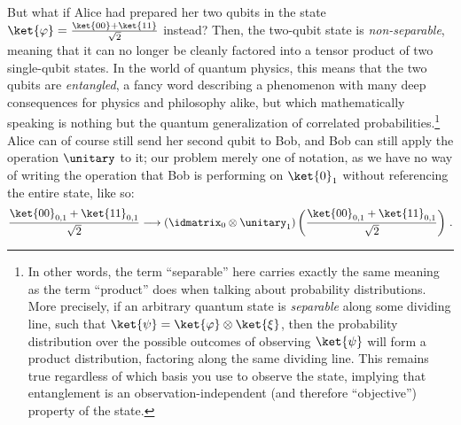     But what if Alice had prepared her two qubits in the state
      $\ket{\varphi} = \frac{\ket{00} + \ket{11}}{\sqrt{2}}$ instead?
      Then, the two-qubit state is \emph{non-separable}, meaning that it can no
      longer be cleanly factored into a tensor product of two single-qubit
      states. In the world of quantum
      physics, this means that the two qubits are \emph{entangled}, a fancy
      word describing a phenomenon with many deep consequences for physics and
      philosophy alike, but which mathematically speaking is nothing but the quantum
      generalization of correlated probabilities.\footnote{
        In other words, the term ``separable'' here carries exactly the same
        meaning as the term ``product'' does when talking about probability distributions.
        More precisely, if an arbitrary quantum state is \emph{separable} along
        some dividing line, such that $\ket{\psi} = \ket{\varphi} \otimes
        \ket{\xi}$, then the probability distribution over the possible
        outcomes of observing $\ket{\psi}$ will
        form a product distribution, factoring along the
        same dividing line. This remains true regardless of
        which basis you use to observe the state, implying that
        entanglement is an observation-independent (and therefore
        ``objective'') property of the state.
      } Alice can of course still send her second qubit to Bob, and Bob can still apply
      the operation $\unitary$ to it; our problem merely one of notation,
      as we have no way of writing the operation that Bob is
      performing on $\ket{0}_1$ without referencing the entire
      state, like so:
      \[
        \frac{\ket{00}_{0,1} + \ket{11}_{0,1}}{\sqrt{2}} \longrightarrow \left( 
        \idmatrix_0 \otimes \unitary_1 \right) 
        \left( \frac{\ket{00}_{0,1} + \ket{11}_{0,1}}{\sqrt{2}} \right)\, .
      \] 

